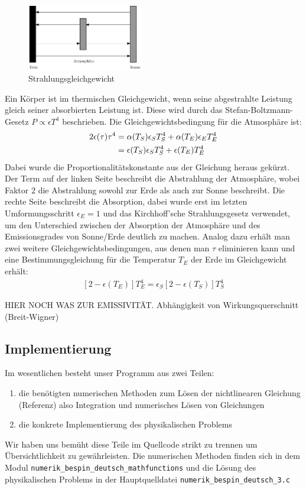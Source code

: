 \documentclass[10pt,a4paper]{article}
\begin{document}
\begin{figure}
\centering
\includegraphics[width=0.45\textwidth]{./figures/strahlungsgleichgewicht.eps}
\caption{Strahlungsgleichgewicht}
\label{fig:strahlungsgleichgewicht}
\end{figure}
Ein Körper ist im thermischen Gleichgewicht, wenn seine abgestrahlte Leistung
gleich seiner absorbierten Leistung ist. Diese wird durch das Stefan-Boltzmann-Gesetz
$P \propto \epsilon T^4$ beschrieben. Die Gleichgewichtsbedingung für die Atmosphäre ist:
\begin{align}
	2\epsilon(\tau)\tau^4 &= \alpha(T_S) \epsilon_S T_S^4 + \alpha(T_E) \epsilon_E T_E^4 \notag \\ &=\epsilon(T_S) \epsilon_S T_S^4 + \epsilon(T_E) T_E^4
\end{align}
Dabei wurde die Proportionalitätskonstante aus der Gleichung heraus gekürzt.
Der Term auf der linken Seite beschreibt die Abstrahlung der Atmosphäre, wobei
Faktor $2$ die Abstrahlung sowohl zur Erde als auch zur Sonne beschreibt.
Die rechte Seite beschreibt die Absorption, dabei wurde erst im letzten
Umformungsschritt $\epsilon_E = 1$ und das Kirchhoff'sche Strahlungsgesetz verwendet,
um den Unterschied zwischen der Absorption der Atmosphäre und des Emissionsgrades von
Sonne/Erde deutlich zu machen.
Analog dazu erhält man zwei weitere Gleichgewichtsbedingungen, aus denen man
$\tau$ eliminieren kann und eine Bestimmungsgleichung für die Temperatur $T_E$
der Erde im Gleichgewicht erhält:
\begin{align}
\left[2-\epsilon(T_E)\right]T_E^4=\epsilon_S\left[2-\epsilon(T_S)\right]T_S^4
\end{align}

HIER NOCH WAS ZUR EMISSIVITÄT. Abhängigkeit von Wirkungsquerschnitt (Breit-Wigner) 

\subsection{Implementierung}
Im wesentlichen besteht unser Programm aus zwei Teilen:
\begin{enumerate}
	\item die benötigten numerischen Methoden zum Lösen der nichtlinearen Gleichung (Referenz) also Integration und numerisches Lösen von Gleichungen
	\item die konkrete Implementierung des physikalischen Problems
\end{enumerate}
Wir haben uns bemüht diese Teile im Quellcode strikt zu trennen um Übersichtlichkeit zu gewährleisten.
Die numerischen Methoden finden sich in dem Modul \texttt{numerik\_bespin\_deutsch\_mathfunctions} und die Lösung des physikalischen Problems in der Hauptquelldatei \texttt{numerik\_bespin\_deutsch\_3.c}
\end{document}
